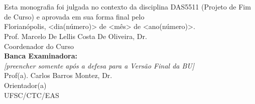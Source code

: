 \imprimircapa

\imprimirfolhaderosto*

\begin{fichacatalografica}
	
\end{fichacatalografica}

\begin{folhadeaprovacao}
	\OnehalfSpacing
	\centering
	\imprimirautor\\%
	\vspace*{10pt}		
	\textbf{\imprimirtitulo}%
	\ifnotempty{\imprimirsubtitulo}{:~\imprimirsubtitulo}\\%
	\vspace*{\baselineskip}
	
	Esta monografia foi julgada no contexto da disciplina DAS5511 (Projeto de Fim de Curso) e aprovada em sua forma final pelo \imprimircurso\\
	\vspace*{\baselineskip}
	Florianópolis, <dia(número)> de <mês> de <ano(número)>.\\
	
	
	\vspace*{2\baselineskip}
	Prof. Marcelo De Lellis Costa De Oliveira, Dr.\\
	Coordenador do Curso\\
	
	\vspace*{\baselineskip}
	\textbf{Banca Examinadora:} \\ \emph{[preencher somente após a defesa para a  Versão Final da BU]} \\
	
	
	\vspace*{2\baselineskip}
	Prof(a). Carlos Barros Montez, Dr.\\
	Orientador(a) \\
	UFSC/CTC/EAS\\
	

\end{folhadeaprovacao}
